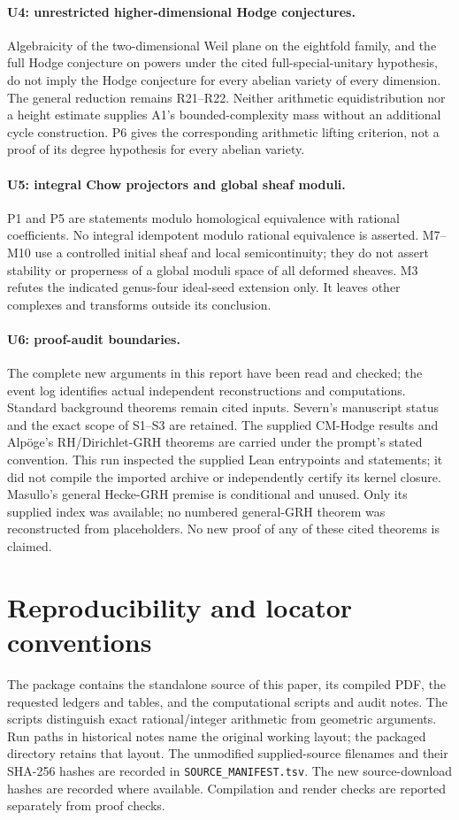 \documentclass[11pt,a4paper]{article}
\theoremstyle{definition}\newtheorem{definition}[theorem]{Definition}
\theoremstyle{remark}\newtheorem{remark}[theorem]{Remark}
\begin{document}
\paragraph{U4: unrestricted higher-dimensional Hodge conjectures.}
Algebraicity of the two-dimensional Weil plane on the eightfold family, and the full Hodge conjecture on powers under the cited full-special-unitary hypothesis, do not imply the Hodge conjecture for every abelian variety of every dimension. The general reduction remains R21--R22. Neither arithmetic equidistribution nor a height estimate supplies A1's bounded-complexity mass without an additional cycle construction. P6 gives the corresponding arithmetic lifting criterion, not a proof of its degree hypothesis for every abelian variety.

\paragraph{U5: integral Chow projectors and global sheaf moduli.}
P1 and P5 are statements modulo homological equivalence with rational coefficients. No integral idempotent modulo rational equivalence is asserted. M7--M10 use a controlled initial sheaf and local semicontinuity; they do not assert stability or properness of a global moduli space of all deformed sheaves. M3 refutes the indicated genus-four ideal-seed extension only. It leaves other complexes and transforms outside its conclusion.

\paragraph{U6: proof-audit boundaries.}
The complete new arguments in this report have been read and checked; the event log identifies actual independent reconstructions and computations. Standard background theorems remain cited inputs. Severn's manuscript status and the exact scope of S1--S3 are retained. The supplied CM-Hodge results and Alp\"oge's RH/Dirichlet-GRH theorems are carried under the prompt's stated convention. This run inspected the supplied Lean entrypoints and statements; it did not compile the imported archive or independently certify its kernel closure. Masullo's general Hecke-GRH premise is conditional and unused. Only its supplied index was available; no numbered general-GRH theorem was reconstructed from placeholders. No new proof of any of these cited theorems is claimed.

\section{Reproducibility and locator conventions}
The package contains the standalone source of this paper, its compiled PDF, the requested ledgers and tables, and the computational scripts and audit notes. The scripts distinguish exact rational/integer arithmetic from geometric arguments. Run paths in historical notes name the original working layout; the packaged  directory retains that layout. The unmodified supplied-source filenames and their SHA-256 hashes are recorded in \texttt{SOURCE\_MANIFEST.tsv}. The new source-download hashes are recorded where available. Compilation and render checks are reported separately from proof checks.
\end{document}
